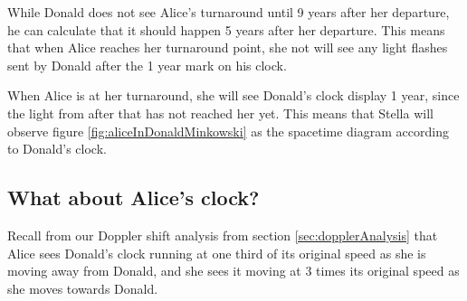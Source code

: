 		While Donald does not see Alice's turnaround until 9 years after her departure, he can calculate that it should happen 5 years after her departure.
		This means that when Alice reaches her turnaround point, she not will see any light flashes sent by Donald after the 1 year mark on his clock.

		When Alice is at her turnaround, she will see Donald's clock display 1 year, since the light from after that has not reached her yet.
		This means that Stella will observe figure \vref{fig:aliceInDonaldMinkowski} as the spacetime diagram according to Donald's clock.
		
	\subsection{What about Alice's clock?}
		Recall from our Doppler shift analysis from section \vref{sec:dopplerAnalysis} that Alice sees Donald's clock running at one third of its original speed as she is moving away from Donald, and she sees it moving at 3 times its original speed as she moves towards Donald.
